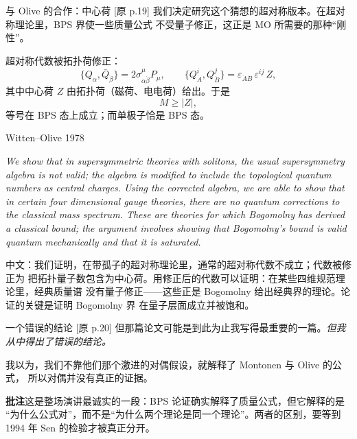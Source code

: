 \documentclass[aspectratio=169,12pt]{ctexbeamer}
\newcommand{\srcp}[1]{{\color{black!40}\scriptsize[原 p.#1]}}
\begin{document}
\begin{frame}{与 Olive 的合作：中心荷}
  \srcp{19} 我们决定研究这个猜想的超对称版本。在超对称理论里，BPS 界使一些质量公式
  不受量子修正，这正是 MO 所需要的那种“刚性”。
  \vspace{0.4em}

  超对称代数被拓扑荷修正：
  \[
    \{Q_\alpha,\bar Q_{\dot\beta}\}=2\sigma^\mu_{\alpha\dot\beta}P_\mu,
    \qquad
    \{Q^i_{\dot A},Q^j_{\dot B}\}=\varepsilon_{\dot A\dot B}\,\varepsilon^{ij}\,Z ,
  \]
  其中中心荷 $Z$ 由拓扑荷（磁荷、电电荷）给出。于是
  \[
    M\ge |Z|,
  \]
  等号在 BPS 态上成立；而单极子恰是 BPS 态。
\end{frame}

\begin{frame}{Witten--Olive 1978}
  \begin{tcolorbox}[enhanced,colback=black!3,colframe=black!3,boxrule=0pt,left=7pt,right=7pt,top=5pt,bottom=5pt,fontupper=\small]
  \emph{We show that in supersymmetric theories with solitons, the usual supersymmetry
  algebra is not valid; the algebra is modified to include the topological quantum numbers
  as central charges. Using the corrected algebra, we are able to show that in certain four
  dimensional gauge theories, there are no quantum corrections to the classical mass
  spectrum. These are theories for which Bogomolny has derived a classical bound; the
  argument involves showing that Bogomolny's bound is valid quantum mechanically and that
  it is saturated.}
  \end{tcolorbox}
  \vspace{0.3em}
  {\small 中文：我们证明，在带孤子的超对称理论里，通常的超对称代数不成立；代数被修正为
  把拓扑量子数包含为中心荷。用修正后的代数可以证明：在某些四维规范理论里，经典质量谱
  没有量子修正——这些正是 Bogomolny 给出经典界的理论。论证的关键是证明 Bogomolny 界
  在量子层面成立并被饱和。}
\end{frame}

\begin{frame}{一个错误的结论}
  \srcp{20} 但那篇论文可能是到此为止我写得最重要的一篇。\emph{但我从中得出了错误的结论。}
  \vspace{0.4em}

  我以为，我们不靠他们那个激进的对偶假设，就解释了 Montonen 与 Olive 的公式，
  所以对偶并没有真正的证据。
  \begin{beizhu}
  \textbf{批注}\quad 这是整场演讲最诚实的一段：BPS 论证确实解释了质量公式，但它解释的是
  “为什么公式对”，而不是“为什么两个理论是同一个理论”。两者的区别，要等到 1994 年
  Sen 的检验才被真正分开。
  \end{beizhu}
\end{frame}
\end{document}
